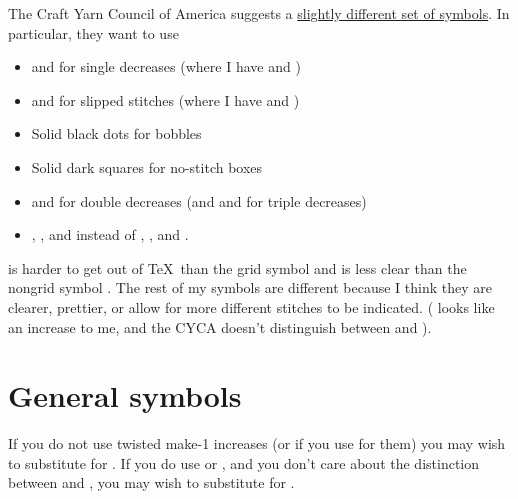 \documentclass{article}
\newif \ifdesigner
\begin{document}
\begin{fullpages}
The Craft Yarn Council of America suggests a \href{http://www.craftyarncouncil.com/chart_knit.html}{slightly different set of symbols}. In particular, they want to use
\begin{itemize}
\item \textknit{)} and \textknit{(} for single decreases (where I have \textknit{>} and \textknit{<})
\item {} and  for slipped stitches (where I have  and )
\item Solid black dots  for bobbles
\item Solid dark squares  for no-stitch boxes
\item 
{}
and 
for double decreases (and 
and 
for triple decreases)
\item {}, , and  instead of , , and .
\end{itemize}
is harder to get out of \TeX\ than the grid symbol {\knitgrid\textknit{,}} and is less clear than the nongrid symbol {\knitnogrid\textknit{,}}. The rest of my symbols are different because I think they are clearer, prettier, or allow for more different stitches to be indicated. ( looks like an increase to me, and the CYCA doesn't distinguish between  and ). \fi

\section{General symbols}

\ifdesigner
If you do not use twisted make-1 increases (or if you use 
for them) you may wish to substitute  for .
If you do use  or , and you don't care about the
distinction between  and , you may wish to
substitute  for .


\end{fullpages}
\end{document}
